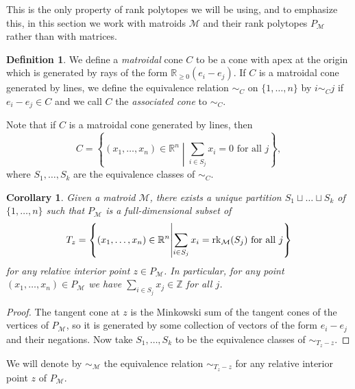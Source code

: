 \documentclass[12pt]{amsart}
\newcommand{\mb}{\mathbb}
\newcommand{\rk}{{\rm rk}}
\newcommand{\MM}{{\mathcal M}}
\theoremstyle{plain}
\newtheorem{Cor}[Thm]{Corollary}
\theoremstyle{definition}
\newtheorem{Def}{Definition}[section]
\theoremstyle{remark}
\begin{document}
This is the only property of rank polytopes we will be using, and to emphasize this, in this section we work with matroids $\MM$ and their rank polytopes $P_\MM$ rather than with matrices.

\begin{Def}
\label{matroidalconedef}
We define a \emph{matroidal} cone $C$ to be a cone with apex at the origin which is generated by rays of the form $\mb{R}_{\ge 0}(e_i-e_j)$. If $C$ is a matroidal cone generated by lines, we define the equivalence relation $\sim_C$ on $\{1, \ldots, n\}$ by $i \sim_C j$ if $e_i - e_j \in C$ and we call $C$ the \emph{associated cone} to $\sim_C$.
\end{Def}
Note that if $C$ is a matroidal cone generated by lines, then \[C = \left\{(x_1, \ldots, x_n) \in \mb{R}^n \middle| \text{$\sum_{i \in S_j} x_i = 0$ for all $j$}\right\},\] where $S_1, \ldots, S_k$ are the equivalence classes of $\sim_C$.

\begin{Cor}
\label{equivrel}
Given a matroid $\MM$, there exists a unique partition $S_1 \sqcup \ldots \sqcup S_k$ of $\{1, \ldots, n\}$ such that $P_\MM$ is a full-dimensional subset of
$$T_z=\left\{(x_1, \ldots, x_n) \in \mb{R}^n \middle| \sum_{i \in S_j} x_i=\rk_{\MM}(S_j)\text{ for all $j$}\right\}$$ for any relative interior point $z \in P_\MM$. In particular, for any point $(x_1, \ldots, x_n) \in P_\MM$ we have $\sum_{i \in S_j} x_j \in \mb{Z}$ for all $j$.

\end{Cor}
\begin{proof}
The tangent cone at $z$ is the Minkowski sum of the tangent cones of the vertices of $P_\MM$, so it is generated by some collection of vectors of the form $e_i-e_j$ and their negations. Now take $S_1, \ldots, S_k$ to be the equivalence classes of $\sim_{T_z - z}$.
\end{proof}

We will denote by $\sim_{\MM}$ the equivalence relation $\sim_{T_{z}-z}$ for any relative interior point $z$ of $P_\MM$.
\end{document}
